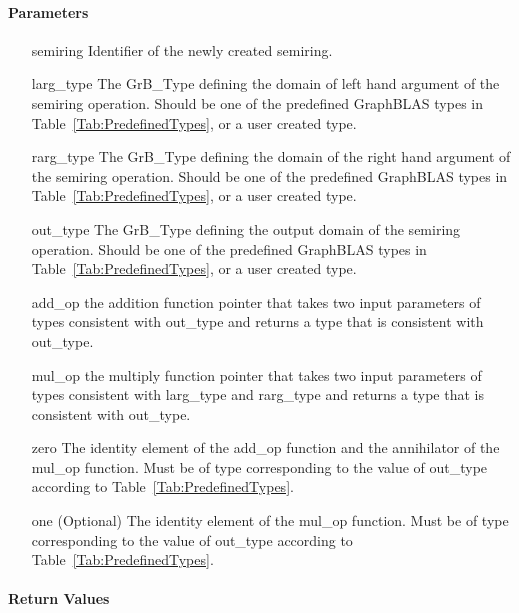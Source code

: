 \paragraph{Parameters}

\begin{itemize}[leftmargin=1.1in]
    \item[{\sf semiring}]       Identifier of the newly created semiring.
    \item[{\sf larg\_type}]     The {\sf GrB\_Type} defining the domain of left hand argument of
    the semiring operation. Should be one of the predefined
    GraphBLAS types in Table~\ref{Tab:PredefinedTypes}, or a user created type.
    \item[{\sf rarg\_type}]     The {\sf GrB\_Type} defining the domain of the right hand 
    argument of the semiring operation. Should be one of the predefined
    GraphBLAS types in Table~\ref{Tab:PredefinedTypes}, or a user created type.
    \item[{\sf out\_type}]      The {\sf GrB\_Type} defining the output domain of the semiring
    operation. Should be one of the predefined
    GraphBLAS types in Table~\ref{Tab:PredefinedTypes}, or a user created type.
    \item[{\sf add\_op}]        the addition function pointer that takes two input parameters
    of types consistent with {\sf out\_type} and returns a type that is consistent with {\sf out\_type}.
    \item[{\sf mul\_op}]        the multiply function pointer that takes two input parameters
    of types consistent with {\sf larg\_type} and {\sf rarg\_type} and returns a type that is consistent with {\sf out\_type}.
    \item[{\sf zero}]           The identity element of the {\sf add\_op} function and the
    annihilator of the {\sf mul\_op} function.   Must be of type corresponding to the
    value of {\sf out\_type} according to Table~\ref{Tab:PredefinedTypes}.
    \item[{\sf one}]            (Optional) The identity element of the {\sf mul\_op} function. 
    Must be of type corresponding to the value of {\sf out\_type} according to
    Table~\ref{Tab:PredefinedTypes}.
\end{itemize}


\paragraph{Return Values}

